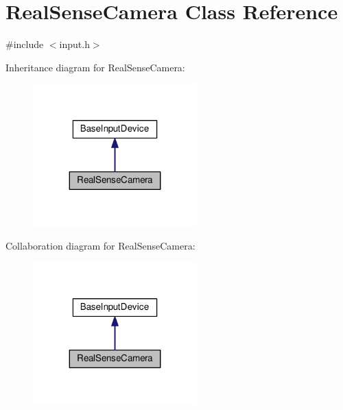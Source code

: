\hypertarget{classRealSenseCamera}{}\section{Real\+Sense\+Camera Class Reference}
\label{classRealSenseCamera}


{\ttfamily \#include $<$input.\+h$>$}



Inheritance diagram for Real\+Sense\+Camera\+:
\nopagebreak
\begin{figure}[H]
\begin{center}
\leavevmode
\includegraphics[width=179pt]{classRealSenseCamera__inherit__graph}
\end{center}
\end{figure}


Collaboration diagram for Real\+Sense\+Camera\+:
\nopagebreak
\begin{figure}[H]
\begin{center}
\leavevmode
\includegraphics[width=179pt]{classRealSenseCamera__coll__graph}
\end{center}
\end{figure}
